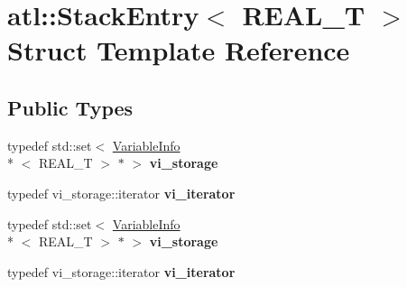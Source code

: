 \hypertarget{structatl_1_1_stack_entry}{\section{atl\+:\+:Stack\+Entry$<$ R\+E\+A\+L\+\_\+\+T $>$ Struct Template Reference}
\label{structatl_1_1_stack_entry}
}
\subsection*{Public Types}
\begin{DoxyCompactItemize}
\item 
\hypertarget{structatl_1_1_stack_entry_a094fab5acbe8dc310c222375fed1b6fe}{typedef std\+::set$<$ \hyperlink{structatl_1_1_variable_info}{Variable\+Info}\\*
$<$ R\+E\+A\+L\+\_\+\+T $>$ $\ast$ $>$ {\bfseries vi\+\_\+storage}}\label{structatl_1_1_stack_entry_a094fab5acbe8dc310c222375fed1b6fe}

\item 
\hypertarget{structatl_1_1_stack_entry_a70322748648b26684961de7ce20cc1d0}{typedef vi\+\_\+storage\+::iterator {\bfseries vi\+\_\+iterator}}\label{structatl_1_1_stack_entry_a70322748648b26684961de7ce20cc1d0}

\item 
\hypertarget{structatl_1_1_stack_entry_a094fab5acbe8dc310c222375fed1b6fe}{typedef std\+::set$<$ \hyperlink{structatl_1_1_variable_info}{Variable\+Info}\\*
$<$ R\+E\+A\+L\+\_\+\+T $>$ $\ast$ $>$ {\bfseries vi\+\_\+storage}}\label{structatl_1_1_stack_entry_a094fab5acbe8dc310c222375fed1b6fe}

\item 
\hypertarget{structatl_1_1_stack_entry_a70322748648b26684961de7ce20cc1d0}{typedef vi\+\_\+storage\+::iterator {\bfseries vi\+\_\+iterator}}\label{structatl_1_1_stack_entry_a70322748648b26684961de7ce20cc1d0}

\end{DoxyCompactItemize}
